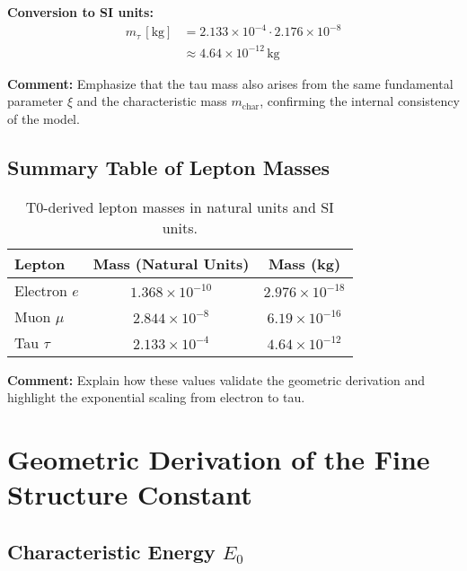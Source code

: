 \documentclass[12pt,a4paper]{article}
\newcommand{\xipar}{\xi}            %
\newcommand{\mchar}{m_{\text{char}}} %
\newcommand{\Ezero}{E_0}            %
\begin{document}
\textbf{Conversion to SI units:}
\begin{align}
	m_\tau \,[\text{kg}] &= 2.133 \times 10^{-4} \cdot 2.176 \times 10^{-8} \\
	&\approx 4.64 \times 10^{-12}\,\text{kg}
\end{align}

\textbf{Comment:} Emphasize that the tau mass also arises from the same fundamental parameter $\xipar$ and the characteristic mass $\mchar$, confirming the internal consistency of the model.

\subsection{Summary Table of Lepton Masses}

\begin{table}[H]
	\centering
	\begin{tabular}{@{}lcc@{}}
		\toprule
		Lepton & Mass (Natural Units) & Mass (kg) \\ \midrule
		Electron $e$ & $1.368 \times 10^{-10}$ & $2.976 \times 10^{-18}$ \\
		Muon $\mu$ & $2.844 \times 10^{-8}$ & $6.19 \times 10^{-16}$ \\
		Tau $\tau$ & $2.133 \times 10^{-4}$ & $4.64 \times 10^{-12}$ \\
		\bottomrule
	\end{tabular}
	\caption{T0-derived lepton masses in natural units and SI units.}
\end{table}

\textbf{Comment:} Explain how these values validate the geometric derivation and highlight the exponential scaling from electron to tau.

	
\section{Geometric Derivation of the Fine Structure Constant}

\subsection{Characteristic Energy $\Ezero$}
\end{document}
